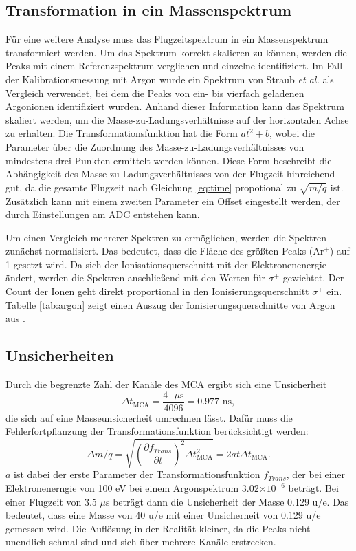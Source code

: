 \subsection{Transformation in ein Massenspektrum}
Für eine weitere Analyse muss das Flugzeitspektrum in ein Massenspektrum transformiert werden. Um das Spektrum korrekt skalieren zu können, werden die Peaks mit einem Referenzspektrum verglichen und einzelne identifiziert. Im Fall der Kalibrationsmessung mit Argon wurde ein Spektrum von Straub \textit{et al.} \cite{Straub} als Vergleich verwendet, bei dem die Peaks von ein- bis vierfach geladenen Argonionen identifiziert wurden. Anhand dieser Information kann das Spektrum skaliert werden, um die Masse-zu-Ladungsverhältnisse auf der horizontalen Achse zu erhalten. Die Transformationsfunktion hat die Form $at^2+b$, wobei die Parameter über die Zuordnung des Masse-zu-Ladungsverhältnisses von mindestens drei Punkten ermittelt werden können. Diese Form beschreibt die Abhängigkeit des Masse-zu-Ladungsverhältnisses von der Flugzeit hinreichend gut, da die gesamte Flugzeit nach Gleichung \ref{eq:time} propotional zu $\sqrt{m/q}$ ist. Zusätzlich kann mit einem zweiten Parameter ein Offset eingestellt werden, der durch Einstellungen am ADC entstehen kann. 

Um einen Vergleich mehrerer Spektren zu ermöglichen, werden die Spektren zunächst normalisiert. Das bedeutet, dass die Fläche des größten Peaks (Ar$^+$) auf 1 gesetzt wird. Da sich der Ionisationsquerschnitt mit der Elektronenenergie ändert, werden die Spektren anschließend mit den Werten für $\sigma^+$ gewichtet. Der Count der Ionen geht direkt proportional in den Ionisierungsquerschnitt $\sigma^+$ ein. Tabelle \ref{tab:argon} zeigt einen Auszug der Ionisierungsquerschnitte von Argon aus \cite{Straub}.

\subsection{Unsicherheiten}
Durch die begrenzte Zahl der Kanäle des MCA ergibt sich eine Unsicherheit \begin{equation}
    \Delta t_{\text{MCA}} = \frac{4 \text{ $\mu$s}}{4096} = 0.977 \text{ ns},
\end{equation} 
die sich auf eine Masseunsicherheit umrechnen lässt. Dafür muss die Fehlerfortpflanzung der Transformationsfunktion berücksichtigt werden:
\begin{equation}
    \Delta m/q = \sqrt{\left(\frac{\partial f_{Trans}}{\partial t}\right)^2 \Delta t_{\text{MCA}}^2} = 2at\Delta t_{\text{MCA}}.
\end{equation}
$a$ ist dabei der erste Parameter der Transformationsfunktion $f_{Trans}$, der bei einer Elektronenerngie von 100 eV bei einem Argonspektrum 3.02$\times 10^{-6}$ beträgt. Bei einer Flugzeit von 3.5 $\mu$s beträgt dann die Unsicherheit der Masse 0.129 u/e. Das bedeutet, dass eine Masse von 40 u/e mit einer Unsicherheit von 0.129 u/e gemessen wird. Die Auflösung in der Realität kleiner, da die Peaks nicht unendlich schmal sind und sich über mehrere Kanäle erstrecken.

